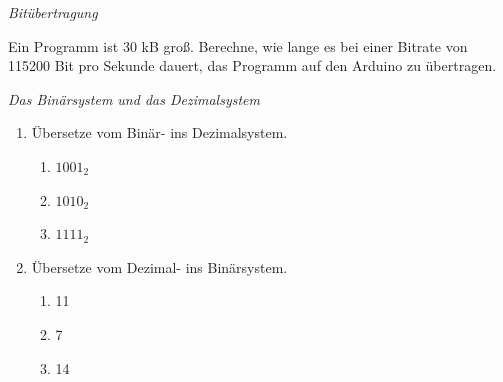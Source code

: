 \bigskip
\begin{aufgabe} \emph{Bitübertragung}
	
	Ein Programm ist 30 kB groß. Berechne, wie lange es bei einer Bitrate von 115200 Bit pro Sekunde dauert, das Programm auf den Arduino zu übertragen.
\end{aufgabe}

\bigskip
\begin{aufgabe} \emph{Das Binärsystem und das Dezimalsystem}
	
	\begin{enumerate}[label=\alph*),itemsep=0mm, parsep=0mm]
		\item Übersetze vom Binär- ins Dezimalsystem.
		\begin{multicols}{3}
			\begin{enumerate}[label=(\arabic*)]
				\item $1001_2$
				\item $1010_2$
				\item $1111_2$
			\end{enumerate}
		\end{multicols}
		\item Übersetze vom Dezimal- ins Binärsystem.
		\begin{multicols}{3}
			\begin{enumerate}[label=(\arabic*)]
				\item 11
				\item 7
				\item 14
			\end{enumerate}
		\end{multicols}
	\end{enumerate}
\end{aufgabe}

